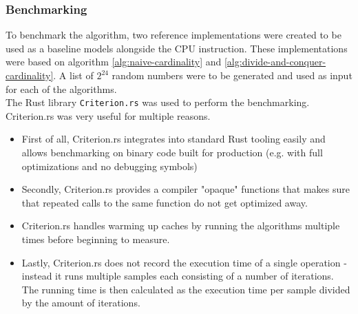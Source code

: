 \subsubsection{Benchmarking}
To benchmark the algorithm, two reference implementations were created to be used as a baseline models alongside the CPU instruction. These implementations were based on algorithm \ref{alg:naive-cardinality} and \ref{alg:divide-and-conquer-cardinality}. A list of $2^{24}$ random numbers were to be generated and used as input for each of the algorithms.\\
The Rust library \texttt{Criterion.rs}\cite{criterion} was used to perform the benchmarking. Criterion.rs was very useful for multiple reasons. 
\begin{itemize}
    \item First of all, Criterion.rs integrates into standard Rust tooling easily and allows benchmarking on binary code built for production (e.g. with full optimizations and no debugging symbols)
    \item Secondly, Criterion.rs provides a compiler "opaque" functions that makes sure that repeated calls to the same function do not get optimized away.
    \item Criterion.rs handles warming up caches by running the algorithms multiple times before beginning to measure.
    \item Lastly, Criterion.rs does not record the execution time of a single operation - instead it runs multiple samples each consisting of a number of iterations. The running time is then calculated as the execution time per sample divided by the amount of iterations. 
\end{itemize}
